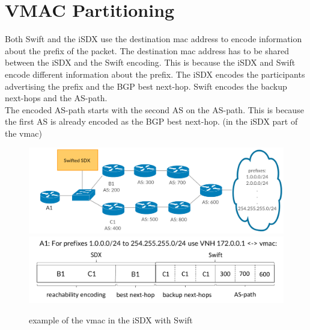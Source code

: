 \section{\label{chapter3:vmac partitioning}VMAC Partitioning}

Both Swift and the iSDX use the destination mac address to encode information about the prefix of the packet. The destination mac address has to be shared between the iSDX and the Swift encoding. This is because the iSDX and Swift encode different information about the prefix. The iSDX encodes the participants advertising the prefix and the BGP best next-hop. Swift encodes the backup next-hops and the AS-path. \\
The encoded AS-path starts with the second AS on the AS-path. This is because the first AS is already encoded as the BGP best next-hop. (in the iSDX part of the vmac)
\begin{figure}[h]
\center
\includegraphics[scale = 0.24]{Figures/design_vmac_topology.pdf}
\includegraphics[scale = 0.35]{Figures/design_vmac_cropped.pdf}
\caption{example of the vmac in the iSDX with Swift}
\end{figure}

\newpage
